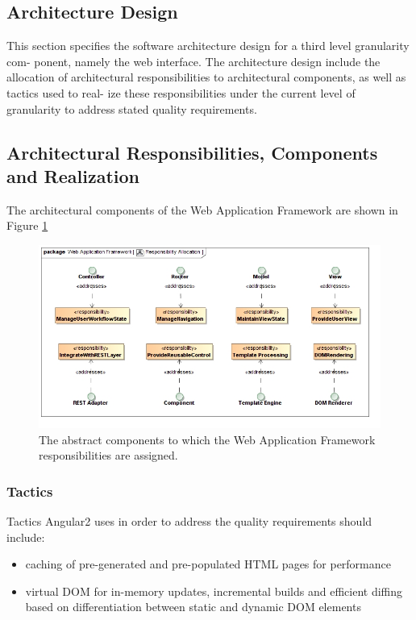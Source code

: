 \subsection{Architecture Design}
This section specifies the software architecture design for a third level granularity com-
ponent, namely the web interface. The architecture design include the allocation of
architectural responsibilities to architectural components, as well as tactics used to real-
ize these responsibilities under the current level of granularity to address stated quality
requirements.



\subsection{Architectural Responsibilities, Components and Realization}
The architectural components of the  Web Application Framework are shown in Figure \ref{fig:webApplicationFrameworkResponsibilityAllocation}
\begin{figure}[H]
	\begin{center}
	\includegraphics[scale=0.5]{../Diagrams and Charts/Web Application Framework/Responsibility Allocation.jpg}
	\caption{The abstract components to which the Web Application Framework responsibilities are assigned.}
	\label{fig:webApplicationFrameworkResponsibilityAllocation}
	\end{center}
\end{figure}



\subsubsection{Tactics}
Tactics Angular2 uses in order to address the quality requirements should include:
\begin{itemize}
	\item caching of pre-generated and pre-populated HTML pages for performance
	\item virtual DOM for in-memory updates, incremental builds and efficient 
	diffing based on differentiation between static and dynamic DOM elements
\end{itemize}



